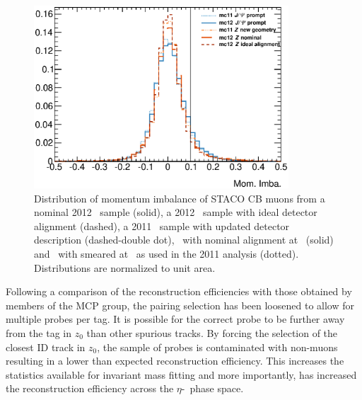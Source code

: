 \begin{figure}[htbp]
  \centering
    \includegraphics[width=0.85\textwidth]{PartCalibration2012/Plots/FixingMomImba/h_muon_momImba.eps}
    \caption{Distribution of momentum imbalance of STACO CB muons from a nominal 2012 \ZMu\ sample (solid), a 2012 \ZMu\ sample with ideal detector alignment (dashed), a 2011 \ZMu\ sample with updated detector description (dashed-double dot), \JMu\ with nominal alignment at \cmsE\ (solid) and \JMu\ with smeared at \cmsS\ as used in the 2011 analysis (dotted). Distributions are normalized to unit area.}
  \label{fig:CalibrationMomImba}
\end{figure}

Following a comparison of the reconstruction efficiencies with those obtained by members of the MCP group, the pairing selection has been loosened to allow for multiple probes per tag. It is possible for the correct probe to be further away from the tag in $z_0$ than other spurious tracks. By forcing the selection of the closest ID track in $z_0$, the sample of probes is contaminated with non-muons resulting in a lower than expected reconstruction efficiency. This increases the statistics available for invariant mass fitting and more importantly, has increased the reconstruction efficiency across the $\eta$-\pt\ phase space.
